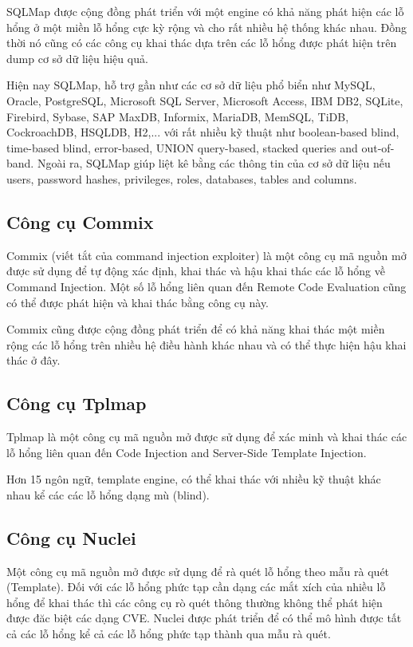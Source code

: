 \documentclass[./../main.tex]{subfiles}
\begin{document}
SQLMap được cộng đồng phát triển với một engine có khả năng phát hiện các
lỗ hổng ở một miền lỗ hổng cực kỳ rộng và cho rất nhiều hệ thống khác nhau.
Đồng thời nó cũng có các công cụ khai thác dựa trên các lỗ hổng được phát
hiện trên dump cơ sở dữ liệu hiệu quả.

Hiện nay SQLMap, hỗ trợ gần như các cơ sở dữ liệu phổ biển như MySQL,
Oracle, PostgreSQL, Microsoft SQL Server, Microsoft Access, IBM DB2,
SQLite, Firebird, Sybase, SAP MaxDB, Informix, MariaDB, MemSQL, TiDB,
CockroachDB, HSQLDB, H2,... với rất nhiều kỹ thuật như boolean-based blind,
time-based blind, error-based, UNION query-based, stacked queries and
out-of-band. Ngoài ra, SQLMap giúp liệt kê bằng các thông tin của cơ
sở dữ liệu nếu users, password hashes, privileges, roles, databases,
tables and columns.

\subsection{Công cụ Commix}
Commix (viết tắt của command injection exploiter) là một công cụ mã nguồn
mở được sử dụng để tự động xác định, khai thác và hậu khai thác các lỗ
hổng về Command Injection. Một số lỗ hổng liên quan đến
Remote Code Evaluation cũng có thể được phát hiện và khai thác bằng công
cụ này.

Commix cũng được cộng đồng phát triển để có khả năng khai
thác một miền rộng các lỗ hổng trên nhiều hệ điều hành khác nhau
và có thể thực hiện hậu khai thác ở đây.
\subsection{Công cụ Tplmap}
Tplmap là một công cụ mã nguồn mở được sử dụng để xác minh và khai
thác các lỗ hổng liên quan đến Code Injection and Server-Side Template
Injection.


Hơn 15 ngôn ngữ, template engine, có thể khai thác với nhiều kỹ thuật
khác nhau kể các các lỗ hổng dạng mù (blind).

\subsection{Công cụ Nuclei}
Một công cụ mã nguồn mở được sử dụng để rà quét lỗ hổng theo mẫu rà quét (Template).
Đối với các lỗ hổng phức tạp cần dạng các mắt xích của nhiều lỗ hổng để
khai thác thì các công cụ rò quét thông thường không thể phát hiện được đăc biệt
các dạng CVE. Nuclei được phát triển để có thể mô hình được tất cả các lỗ
hổng kể cả các lỗ hổng phức tạp thành qua mẫu rà quét.
\end{document}
